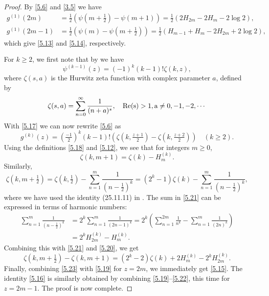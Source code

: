 \documentclass{amsart}
\theoremstyle{definition}
\theoremstyle{remark}
\numberwithin{equation}{section}
\begin{document}
\begin{proof}
By \eqref{5.6} and \eqref{3.5} we have
\begin{align*}
g^{(1)}(2m)&=\frac{1}{2}\left(\psi(m+\tfrac{1}{2})-\psi(m+1)\right)
=\frac{1}{2}\left(2H_{2m}-2H_m-2\log{2}\right),\\
g^{(1)}(2m-1)&=\frac{1}{2}\left(\psi(m)-\psi(m+\tfrac{1}{2})\right)
=\frac{1}{2}\left(H_{m-1}+H_m-2H_{2m}+2\log{2}\right),
\end{align*}
which give \eqref{5.13} and \eqref{5.14}, respectively.

For $k\geq 2$, we first note that by \cite[eq.~(25.11.12)]{DLMF} we have
\begin{equation}\label{5.17}
\psi^{(k-1)}(z)=(-1)^k(k-1)!\zeta(k,z),
\end{equation}
where $\zeta(s,a)$ is the Hurwitz zeta function with complex parameter $a$,
defined by
\begin{equation}\label{5.18}
\zeta(s,a) = \sum_{n=0}^\infty\frac{1}{(n+a)^s},\quad \rm{Re}(s)>1, 
a\neq 0, -1, -2,\cdots
\end{equation}
With \eqref{5.17} we can now rewrite \eqref{5.6} as
\begin{equation}\label{5.19}
g^{(k)}(z)=\left(\tfrac{-1}{2}\right)^k(k-1)!
\left(\zeta(k,\tfrac{z+1}{2})-\zeta(k,\tfrac{z+2}{2})\right)\quad (k\geq 2).
\end{equation}
Using the definitions \eqref{5.18} and \eqref{5.12}, we see that for integers
$m\geq 0$,
\begin{equation}\label{5.20}
\zeta(k,m+1) = \zeta(k)-H_m^{(k)}.
\end{equation}
Similarly,
\begin{equation}\label{5.21}
\zeta(k,m+\tfrac{1}{2}) 
= \zeta(k,\tfrac{1}{2})-\sum_{n=1}^m\frac{1}{(n-\tfrac{1}{2})^k}
= (2^k-1)\zeta(k)-\sum_{n=1}^m\frac{1}{(n-\tfrac{1}{2})^k},
\end{equation}
where we have used the identity (25.11.11) in \cite{DLMF}. The sum in 
\eqref{5.21} can be expressed in terms of harmonic numbers:
\begin{align}
\sum_{n=1}^m\frac{1}{(n-\tfrac{1}{2})^k}&=2^k\sum_{n=1}^m\frac{1}{(2n-1)^k}
=2^k\left(\sum_{n=1}^{2m}\frac{1}{n^k}-\sum_{n=1}^m\frac{1}{(2n)^k}\right)
\label{5.22}\\
&= 2^kH_{2m}^{(k)}-H_m^{(k)}.\nonumber
\end{align}
Combining this with \eqref{5.21} and \eqref{5.20}, we get
\begin{equation}\label{5.23}
\zeta(k,m+\tfrac{1}{2})-\zeta(k,m+1)
= (2^k-2)\zeta(k) + 2H_m^{(k)}-2^kH_{2m}^{(k)}.
\end{equation}
Finally, combining \eqref{5.23} with \eqref{5.19} for $z=2m$, we immediately
get \eqref{5.15}. The identity \eqref{5.16} is similarly obtained by 
combining \eqref{5.19}--\eqref{5.22}, this time for $z=2m-1$. The proof is now
complete.
\end{proof}
\end{document}
